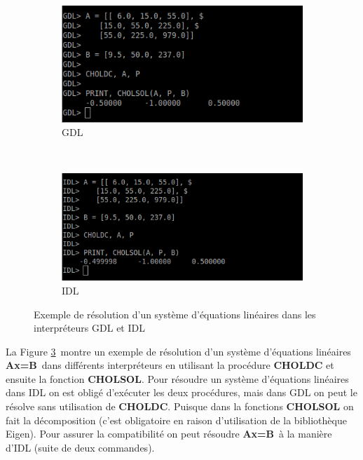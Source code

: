 \begin{figure}[!ht]
\centering
	\begin{subfigure}[b]{0.6\textwidth}
    	\centering
    		\includegraphics[width=\textwidth]{./images/ex_chols.png}
    		 \caption{GDL}
    		 \label{ex_chols_gdl}
    \end{subfigure}
    ~
    \begin{subfigure}[b]{0.6\textwidth}
    	\centering
    		\includegraphics[width=\textwidth]{./images/ex_chols_idl.png}
    		\caption{IDL}
    		\label{ex_chols_idl}
    \end{subfigure}
    
    \caption{Exemple de résolution d'un système d'équations linéaires dans les interpréteurs GDL et IDL}
    \label{ex_chols}
\end{figure}

La Figure \ref{ex_chols}\ montre un exemple de résolution d'un système
d'équations linéaires \textbf{Ax=B}\ dans différents interpréteurs en utilisant
la procédure \textbf{CHOLDC} et ensuite la fonction \textbf{CHOLSOL}. Pour
résoudre un système d'équations linéaires dans IDL on est obligé d’exécuter les
deux procédures, mais dans GDL on peut le résolve sans utilisation de
\textbf{CHOLDC}. Puisque dans la fonctions \textbf{CHOLSOL} on fait la
décomposition (c'est obligatoire en raison d'utilisation de la bibliothèque Eigen).
Pour assurer la compatibilité on peut résoudre \textbf{Ax=B}\ à la manière d'IDL
(suite de deux commandes).

